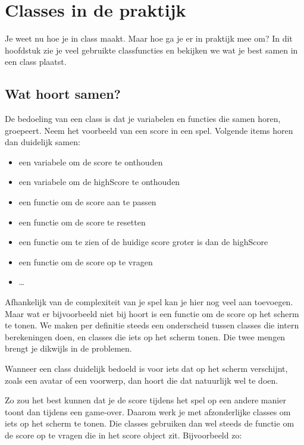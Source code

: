 \chapter{Classes in de praktijk}

Je weet nu hoe je in class maakt. Maar hoe ga je er in praktijk mee om? In dit hoofdstuk zie je veel gebruikte classfuncties en bekijken we wat je best samen in een class plaatst.

\section{Wat hoort samen?}
De bedoeling van een class is dat je variabelen en functies die samen horen, groepeert. Neem het voorbeeld van een score in een spel. Volgende items horen dan duidelijk samen:

\begin{itemize}
\item een variabele om de score te onthouden
\item een variabele om de highScore te onthouden
\item een functie om de score aan te passen
\item een functie om de score te resetten
\item een functie om te zien of de huidige score groter is dan de highScore
\item een functie om de score op te vragen
\item \ldots
\end{itemize}

Afhankelijk van de complexiteit van je spel kan je hier nog veel aan toevoegen. Maar wat er bijvoorbeeld niet bij hoort is een functie om de score op het scherm te tonen. We maken per definitie steeds een onderscheid tussen classes die intern berekeningen doen, en classes die iets op het scherm tonen. Die twee mengen brengt je dikwijls in de problemen.

Wanneer een class duidelijk bedoeld is voor iets dat op het scherm verschijnt, zoals een avatar of een voorwerp, dan hoort die dat natuurlijk wel te doen.

Zo zou het best kunnen dat je de score tijdens het spel op een andere manier toont dan tijdens een game-over. Daarom werk je met afzonderlijke classes om iets op het scherm te tonen. Die classes gebruiken dan wel steeds de functie om de score op te vragen die in het score object zit. Bijvoorbeeld zo:

